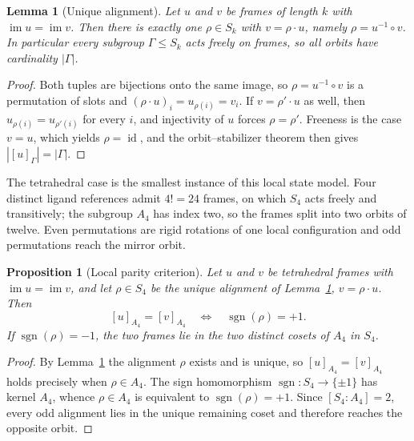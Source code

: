 \documentclass[pdflatex,sn-mathphys-num,referee,lineno]{sn-jnl}
\theoremstyle{plain}
\newtheorem{proposition}[theorem]{Proposition}
\newtheorem{lemma}[theorem]{Lemma}
\theoremstyle{remark}
\theoremstyle{definition}
\begin{document}
\begin{lemma}[Unique alignment]
\label{lem:unique-alignment}
Let \(u\) and \(v\) be frames of length \(k\) with
\(\operatorname{im}u=\operatorname{im}v\).  Then there is exactly one
\(\rho\in S_k\) with \(v=\rho\cdot u\), namely \(\rho=u^{-1}\circ v\).  In
particular every subgroup \(\Gamma\leq S_k\) acts freely on frames, so all
orbits have cardinality \(|\Gamma|\).
\end{lemma}

\begin{proof}
Both tuples are bijections onto the same image, so \(\rho=u^{-1}\circ v\) is a
permutation of slots and \((\rho\cdot u)_i=u_{\rho(i)}=v_i\).  If
\(v=\rho'\cdot u\) as well, then \(u_{\rho(i)}=u_{\rho'(i)}\) for every \(i\),
and injectivity of \(u\) forces \(\rho=\rho'\).  Freeness is the case
\(v=u\), which yields \(\rho=\operatorname{id}\), and the orbit--stabilizer
theorem then gives \(|[u]_\Gamma|=|\Gamma|\).
\end{proof}

The tetrahedral case is the smallest instance of this local state model.  Four
distinct ligand references admit \(4!=24\) frames, on which \(S_4\) acts freely
and transitively; the subgroup \(A_4\) has index two, so the frames split into
two orbits of twelve.  Even permutations are rigid rotations of one local
configuration and odd permutations reach the mirror orbit.

\begin{proposition}[Local parity criterion]
\label{prop:local-parity}
Let \(u\) and \(v\) be tetrahedral frames with
\(\operatorname{im}u=\operatorname{im}v\), and let \(\rho\in S_4\) be the unique
alignment of Lemma~\ref{lem:unique-alignment}, \(v=\rho\cdot u\).  Then
\[
 [u]_{A_4}=[v]_{A_4}
 \quad\Longleftrightarrow\quad
 \operatorname{sgn}(\rho)=+1 .
\]
If \(\operatorname{sgn}(\rho)=-1\), the two frames lie in the two distinct
cosets of \(A_4\) in \(S_4\).
\end{proposition}

\begin{proof}
By Lemma~\ref{lem:unique-alignment} the alignment \(\rho\) exists and is unique,
so \([u]_{A_4}=[v]_{A_4}\) holds precisely when \(\rho\in A_4\).  The sign
homomorphism \(\operatorname{sgn}:S_4\to\{\pm1\}\) has kernel \(A_4\), whence
\(\rho\in A_4\) is equivalent to \(\operatorname{sgn}(\rho)=+1\).  Since
\([S_4:A_4]=2\), every odd alignment lies in the unique remaining coset and
therefore reaches the opposite orbit.
\end{proof}
\end{document}
